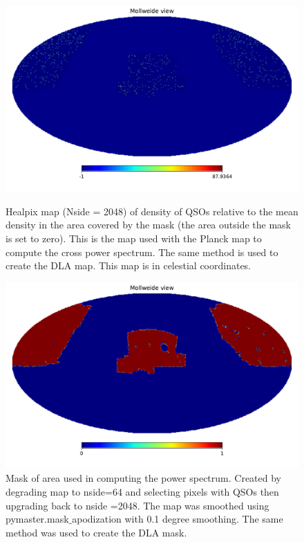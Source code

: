 \documentclass{amsart}
\begin{document}
\begin{figure}
  \includegraphics[width=\linewidth]{qso_map.pdf}
  \caption{Healpix map (Nside = 2048) of density of QSOs relative to the mean density in the area covered by the mask (the area outside the mask is set to zero). This is the map used with the Planck map to compute the cross power spectrum. The same method is used to create the DLA map. This map is in celestial coordinates. }
  \label{fig:qsomap}

  \includegraphics[width=\linewidth]{qso_mask.pdf}
  \caption{Mask of area used in computing the power spectrum. Created by degrading map to nside=64 and selecting pixels with QSOs then upgrading back to nside =2048. The map was smoothed using pymaster.mask$\_$apodization with 0.1 degree smoothing. The same method was used to create the DLA mask. }
  \label{fig:qsomask}
\end{figure}
\end{document}
